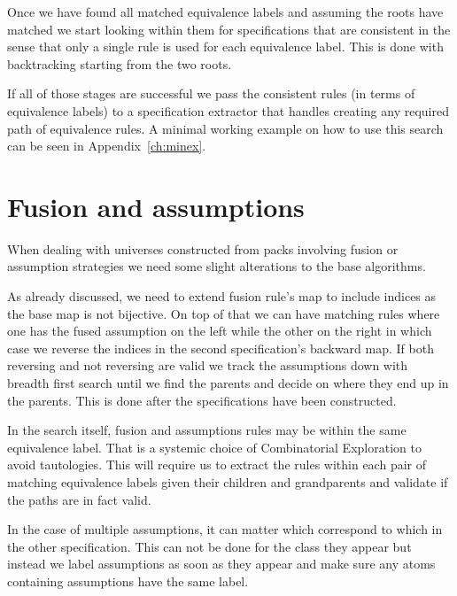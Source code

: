 Once we have found all matched equivalence labels and assuming the roots have matched we start looking within them for specifications that are consistent in the sense that only a single rule is used for each equivalence label. This is done with backtracking starting from the two roots.

If all of those stages are successful we pass the consistent rules (in terms of equivalence labels) to a specification extractor that handles creating any required path of equivalence rules. A minimal working example on how to use this search can be seen in Appendix~\ref{ch:minex}.


\section{Fusion and assumptions}
When dealing with universes constructed from packs involving fusion or assumption strategies we need some slight alterations to the base algorithms. 

As already discussed, we need to extend fusion rule's map to include indices as the base map is not bijective. On top of that we can have matching rules where one has the fused assumption on the left while the other on the right in which case we reverse the indices in the second specification's backward map. If both reversing and not reversing are valid we track the assumptions down with breadth first search until we find the parents and decide on where they end up in the parents. This is done after the specifications have been constructed.

In the search itself, fusion and assumptions rules may be within the same equivalence label. That is a systemic choice of Combinatorial Exploration to avoid tautologies. This will require us to extract the rules within each pair of matching equivalence labels given their children and grandparents and validate if the paths are in fact valid.

In the case of multiple assumptions, it can matter which correspond to which in the other specification. This can not be done for the class they appear but instead we label assumptions as soon as they appear and make sure any atoms containing assumptions have the same label.